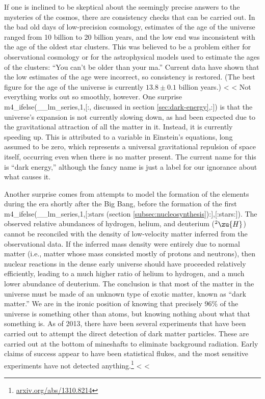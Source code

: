 If one is inclined to be skeptical about the seemingly precise answers to the mysteries of the cosmos,
there are consistency checks that can be carried out. In the bad old days of low-precision cosmology, estimates
of the age of the universe ranged from 10 billion to 20 billion years, and the
low end was inconsistent with the age of the oldest star clusters. This was believed to be a problem either for
observational cosmology or for the astrophysical models used to estimate the ages of the clusters: ``You can't be
older than your ma.'' Current data have shown that the low estimates of the age were incorrect, so consistency is
restored. (The best figure for the age of the universe is currently $13.8\pm0.1$ billion years.)
<%
<%
Not everything works out so smoothly, however. One surprise%
m4_ifelse(__lm_series,1,[:, discussed in section \ref{sec:dark-energy},:]) is that
the universe's expansion is not currently slowing down, as had been expected due to the gravitational attraction of 
all the matter in it. Instead, it is currently speeding up. This is attributed to a variable in Einstein's equations, long
assumed to be zero, which represents a universal gravitational repulsion of space itself, occurring even when there is no
matter present. The current name for this is ``dark energy,'' although the fancy name is just a
label for our ignorance about what causes it.

Another surprise comes from attempts to model the formation of the elements during the era shortly after the Big Bang, before the
formation of the first
m4_ifelse(__lm_series,1,[:stars (section \ref{subsec:nucleosynthesis}):],[:stars:]). The observed relative abundances of hydrogen, helium, and deuterium ($^2\zu{H}$) cannot be
reconciled with the density of low-velocity matter inferred from the observational
data. If the inferred mass density were entirely due to normal matter (i.e., matter whose mass
consisted mostly of protons and neutrons), then nuclear reactions in the dense early universe should have
proceeded relatively efficiently, leading to a much higher ratio of helium to hydrogen, and a much lower
abundance of deuterium. The conclusion is that most of the matter in the universe must be made of
an unknown type of exotic matter, known as ``dark matter.''
We are in the ironic position of knowing that precisely 96\% of
the universe is something other than atoms, but knowing
nothing about what that something is. As of 2013, there have been several experiments that have
been carried out to attempt the direct detection of dark matter particles. These are carried out
at the bottom of mineshafts to eliminate background radiation.
Early claims of success appear to have been statistical flukes, and the most sensitive
experiments have not detected 
anything.\footnote{\url{arxiv.org/abs/1310.8214}}
<%
<%
